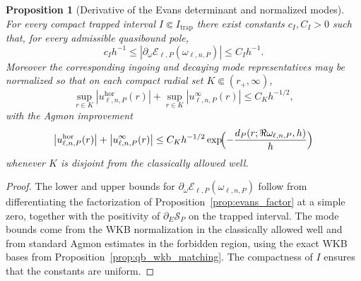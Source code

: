 \documentclass[12pt]{article}
\numberwithin{equation}{section}
\theoremstyle{plain}
\newtheorem{proposition}[theorem]{Proposition}
\theoremstyle{definition}
\theoremstyle{remark}
\newcommand{\hor}{\mathrm{hor}}
\newcommand{\cE}{\mathcal E}
\newcommand{\abs}[1]{\left|#1\right|}
\begin{document}
\begin{proposition}[Derivative of the Evans determinant and normalized modes]\label{prop:qb_evans_derivative}
For every compact trapped interval $I\Subset I_{\mathrm{trap}}$ there exist constants $c_I,C_I>0$ such that, for every admissible quasibound pole,
\[
   c_I h^{-1}
   \le
   \abs{\partial_\omega\cE_{\ell,P}(\omega_{\ell,n,P})}
   \le
   C_I h^{-1}.
\]
Moreover the corresponding ingoing and decaying mode representatives may be normalized so that on each compact radial set $K\Subset(r_+,\infty)$,
\[
   \sup_{r\in K}\abs{u^{\hor}_{\ell,n,P}(r)}+
   \sup_{r\in K}\abs{u^{\infty}_{\ell,n,P}(r)}
   \le C_K h^{-1/2},
\]
with the Agmon improvement
\[
   \abs{u^{\hor}_{\ell,n,P}(r)}+
   \abs{u^{\infty}_{\ell,n,P}(r)}
   \le C_K h^{-1/2}\exp\!\Bigl(-\frac{d_P(r;\Re\omega_{\ell,n,P},h)}{h}\Bigr)
\]
whenever $K$ is disjoint from the classically allowed well.
\end{proposition}

\begin{proof}
The lower and upper bounds for $\partial_\omega\cE_{\ell,P}(\omega_{\ell,n,P})$ follow from differentiating the factorization of Proposition~\ref{prop:evans_factor} at a simple zero, together with the positivity of $\partial_E\mathscr S_P$ on the trapped interval.  The mode bounds come from the WKB normalization in the classically allowed well and from standard Agmon estimates in the forbidden region, using the exact WKB bases from Proposition~\ref{prop:qb_wkb_matching}.  The compactness of $I$ ensures that the constants are uniform.
\end{proof}
\end{document}
